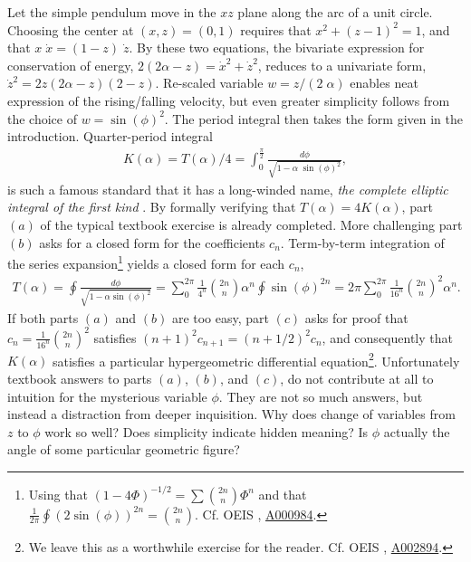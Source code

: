\documentclass[nofootinbib,preprint]{revtex4-1}
\begin{document}
Let the simple pendulum move in the $xz$ plane along the arc of a unit circle. Choosing 
the center at $(x,z)=(0,1)$ requires that  $x^2+(z-1)^2=1$, and that $x\;\dot{x}=(1-z)\;\dot{z}$.
By these two equations, the bivariate expression for conservation of energy,
$2(2\alpha-z)=\dot{x}^2+\dot{z}^2$, reduces to a univariate form, $\dot{z}^2=2z(2\alpha-z)(2-z)$. 
Re-scaled variable 
$w=z/(2\;\alpha)$ enables neat expression of the rising/falling velocity, but even greater 
simplicity follows from the choice of $w=\sin(\phi)^2$. The period integral then takes 
the form given in the introduction. Quarter-period integral
\begin{eqnarray}
K(\alpha)=T(\alpha)/4=\int_{0}^{\frac{\pi}{2}} \frac{d\phi}{\sqrt{1-\alpha\;\sin(\phi)^2}}, 
\nonumber
\end{eqnarray}
is such a famous standard that it has a long-winded name, \textit{the complete elliptic 
integral of the first kind} \cite{LL1982}. By formally verifying that $T(\alpha)=4K(\alpha)$, 
part $(a)$ of the typical textbook exercise is already completed. More challenging part 
$(b)$ asks for a closed form for the coefficients $c_n$. Term-by-term integration of 
the series expansion\footnote{Using that $(1-4\Phi)^{-1/2} = \sum \binom{2n}{n}\Phi^n $ 
and that $\tfrac{1}{2\pi}\oint (2\sin(\phi))^{2n} =  \binom{2n}{n}$. Cf. OEIS \cite{SLOANE2019},  
\href{https://oeis.org/A000984}{A000984}.} 
yields a closed form for each $c_n$,
\begin{eqnarray}
T(\alpha)= \oint \frac{d\phi}{\sqrt{1-\alpha \sin(\phi)^2}}
=\sum_{0}^{2\pi} \frac{1}{4^n}\binom{2n}{n} \alpha^n \oint\sin(\phi)^{2n}
= 2\pi \sum_{0}^{2\pi} \frac{1}{16^n}\binom{2n}{n}^2 \alpha^n. \nonumber 
\end{eqnarray}
If both parts $(a)$ and $(b)$ are too easy, part $(c)$ asks for proof that 
$c_n=\frac{1}{16^n}\binom{2n}{n}^2$ satisfies ${(n+1)^2 c_{n+1}=(n+1/2)^2c_n}$, and 
consequently that $K(\alpha)$ satisfies a particular hypergeometric differential 
equation\footnote{We leave this as a worthwhile exercise for the reader. Cf. 
OEIS \cite{SLOANE2019}, \href{https://oeis.org/A002894}{A002894}.}. Unfortunately textbook 
answers to parts $(a)$, $(b)$, and $(c)$, do not contribute at all to intuition for 
the mysterious variable $\phi$. They are not so much answers, but instead a distraction
from deeper inquisition. Why does change of variables from $z$ to $\phi$ 
work so well? Does simplicity indicate hidden meaning? Is $\phi$ actually
the angle of some particular geometric figure? 
\end{document}
